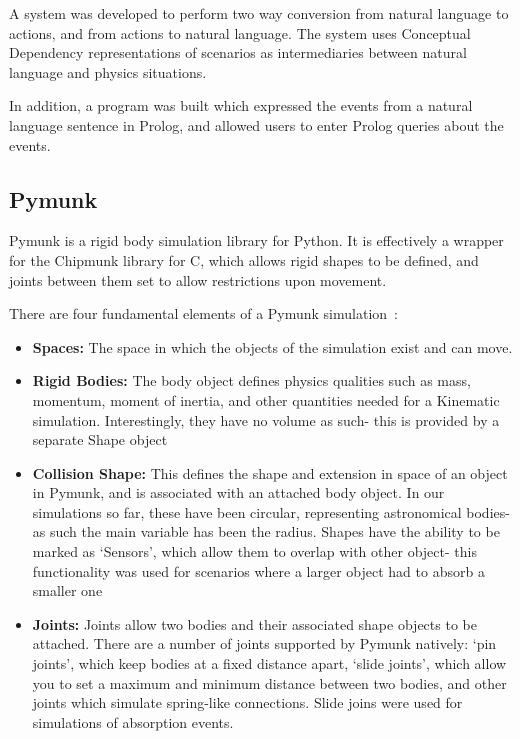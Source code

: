 \documentclass[dissertation.tex]{subfiles}
\begin{document}
    A system was developed to perform two way conversion from natural language to actions, and from actions to natural language. The system uses Conceptual Dependency representations of scenarios as intermediaries between natural language and physics situations.

    In addition, a program was built which expressed the events from a natural language sentence in Prolog, and allowed users to enter Prolog queries about the events.

    \subsection{Pymunk}
    Pymunk is a rigid body simulation library for Python. It is effectively a wrapper for the Chipmunk library for C, which allows rigid shapes to be defined, and joints between them set to allow restrictions upon movement.

    There are four fundamental elements of a Pymunk simulation~\cite{pymunk}:
    \begin{itemize}
        \item \textbf{Spaces:} The space in which the objects of the simulation exist and can move.
        \item \textbf{Rigid Bodies:} The body object defines physics qualities such as mass, momentum, moment of inertia, and other quantities needed for a Kinematic simulation. Interestingly, they have no volume as such- this is provided by a separate Shape object
        \item \textbf{Collision Shape:} This defines the shape and extension in space of an object in Pymunk, and is associated with an attached body object. In our simulations so far, these have been circular, representing astronomical bodies- as such the main variable has been the radius. Shapes have the ability to be marked as `Sensors', which allow them to overlap with other object- this functionality was used for scenarios where a larger object had to absorb a smaller one
        \item \textbf{Joints:} Joints allow two bodies and their associated shape objects to be attached. There are a number of joints supported by Pymunk natively: `pin joints', which keep bodies at a fixed distance apart, `slide joints', which allow you to set a maximum and minimum distance between two bodies, and other joints which simulate spring-like connections. Slide joins were used for simulations of absorption events. 
    \end{itemize}
\end{document}

